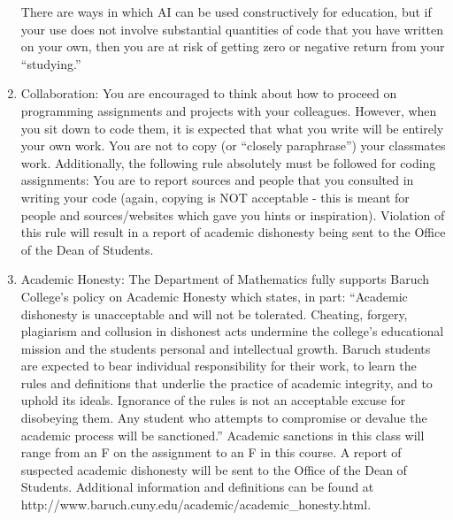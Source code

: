 \documentclass[a4paper]{article}
\begin{document}
\begin{enumerate}
    There are ways in which AI can be used constructively for education, but if your use does not
    involve substantial quantities of code that you have written on your own, then you are at risk of
    getting zero or negative return from your “studying.”
    \item Collaboration: You are encouraged to think about how to proceed on programming assignments
    and projects with your colleagues. However, when you sit down to code them, it is expected that
    what you write will be entirely your own work. You are not to copy (or “closely paraphrase”)
    your classmates work.
    Additionally, the following rule absolutely must be followed for coding assignments:
    You are to report sources and people that you consulted in writing your code (again,
    copying is NOT acceptable - this is meant for people and sources/websites which gave
    you hints or inspiration).
    Violation of this rule will result in a report of academic dishonesty being sent to the Office of the
    Dean of Students.
    \item Academic Honesty: The Department of Mathematics fully supports Baruch College's policy on
    Academic Honesty which states, in part: “Academic dishonesty is unacceptable and will not be
    tolerated. Cheating, forgery, plagiarism and collusion in dishonest acts undermine the college's
    educational mission and the students personal and intellectual growth. Baruch students are
    expected to bear individual responsibility for their work, to learn the rules and definitions that
    underlie the practice of academic integrity, and to uphold its ideals. Ignorance of the rules is not
    an acceptable excuse for disobeying them. Any student who attempts to compromise or devalue
    the academic process will be sanctioned.”
    Academic sanctions in this class will range from an F on the assignment to an F in this course.
    A report of suspected academic dishonesty will be sent to the Office of the Dean of Students.
    Additional information and definitions can be found at
    http://www.baruch.cuny.edu/academic/academic\_honesty.html.
\end{enumerate}
\end{document}
